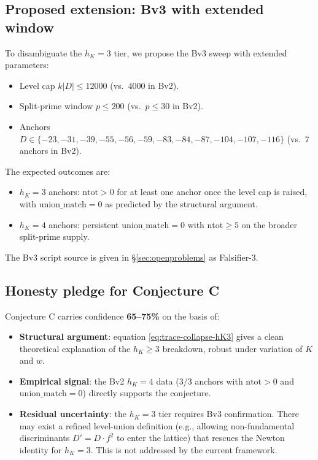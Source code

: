 \documentclass[11pt,a4paper]{amsart}
\theoremstyle{definition}
\newcommand{\hK}{h_{K}}
\begin{document}
\subsection{Proposed extension: Bv3 with extended window}\label{sec:conjC-Bv3}

To disambiguate the $\hK = 3$ tier, we propose the Bv3 sweep with extended parameters:
\begin{itemize}[leftmargin=2em]
  \item Level cap $k|D| \le 12000$ (vs.\ $4000$ in Bv2).
  \item Split-prime window $p \le 200$ (vs.\ $p \le 30$ in Bv2).
  \item Anchors $D \in \{-23, -31, -39, -55, -56, -59, -83, -84, -87, -104, -107, -116\}$ (vs.\ 7 anchors in Bv2).
\end{itemize}

The expected outcomes are:
\begin{itemize}[leftmargin=2em]
  \item $\hK = 3$ anchors: $\mathrm{ntot} > 0$ for at least one anchor once the level cap is raised, with $\mathrm{union\_match} = 0$ as predicted by the structural argument.
  \item $\hK = 4$ anchors: persistent $\mathrm{union\_match} = 0$ with $\mathrm{ntot} \ge 5$ on the broader split-prime supply.
\end{itemize}

The Bv3 script source is given in \S\ref{sec:openproblems} as Falsifier-3.

\subsection{Honesty pledge for Conjecture C}\label{sec:conjC-honesty}

Conjecture C carries confidence \textbf{65--75\%} on the basis of:
\begin{itemize}[leftmargin=2em]
  \item \textbf{Structural argument}: equation \eqref{eq:trace-collapse-hK3} gives a clean theoretical explanation of the $\hK \ge 3$ breakdown, robust under variation of $K$ and $w$.
  \item \textbf{Empirical signal}: the Bv2 $\hK = 4$ data (3/3 anchors with $\mathrm{ntot} > 0$ and $\mathrm{union\_match} = 0$) directly supports the conjecture.
  \item \textbf{Residual uncertainty}: the $\hK = 3$ tier requires Bv3 confirmation. There may exist a refined level-union definition (e.g., allowing non-fundamental discriminants $D' = D \cdot f^2$ to enter the lattice) that rescues the Newton identity for $\hK = 3$. This is not addressed by the current framework.
\end{itemize}
\end{document}
